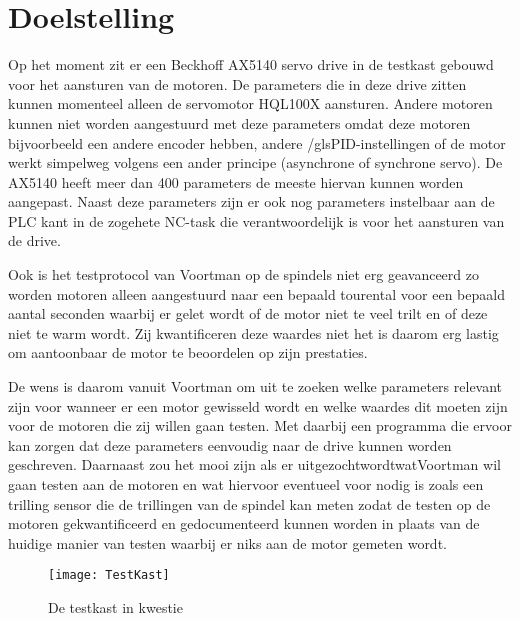 \section{Doelstelling}

Op het moment zit er een Beckhoff \gls{AX5140} servo drive in de testkast gebouwd
voor het aansturen van de motoren. De parameters die in deze drive zitten kunnen
momenteel alleen de servomotor HQL100X aansturen. Andere motoren kunnen
niet worden aangestuurd met deze parameters omdat deze motoren bijvoorbeeld
een andere encoder hebben, andere /gls{PID}-instellingen of de motor werkt simpelweg
volgens een ander principe (asynchrone of synchrone servo). De \gls{AX5140} heeft
meer dan 400 parameters de meeste hiervan kunnen worden aangepast. Naast deze
parameters zijn er ook nog parameters instelbaar aan de \gls{PLC} kant in de zogehete
\gls{NC}-task die verantwoordelijk is voor het aansturen van de drive.

\vspace{0.5cm}

Ook is het testprotocol van Voortman op de spindels niet erg geavanceerd zo
worden motoren alleen aangestuurd naar een bepaald tourental voor een bepaald
aantal seconden waarbij er gelet wordt of de motor niet te veel trilt en of deze niet
te warm wordt. Zij kwantificeren deze waardes niet het is daarom erg lastig om
aantoonbaar de motor te beoordelen op zijn prestaties.

\vspace{0.5cm}

De wens is daarom vanuit Voortman om uit te zoeken welke parameters relevant
zijn voor wanneer er een motor gewisseld wordt en welke waardes dit moeten zijn
voor de motoren die zij willen gaan testen. Met daarbij een programma die ervoor
kan zorgen dat deze parameters eenvoudig naar de drive kunnen worden geschreven.
Daarnaast zou het mooi zijn als er uitgezochtwordtwatVoortman wil gaan testen aan
de motoren en wat hiervoor eventueel voor nodig is zoals een trilling sensor die de
trillingen van de spindel kan meten zodat de testen op de motoren gekwantificeerd en
gedocumenteerd kunnen worden in plaats van de huidige manier van testen waarbij
er niks aan de motor gemeten wordt.

\begin{figure}[H]
	\centering
	\texttt{[image: TestKast]}
	\label{fig:Testkast}
	\caption{De testkast in kwestie}
\end{figure}